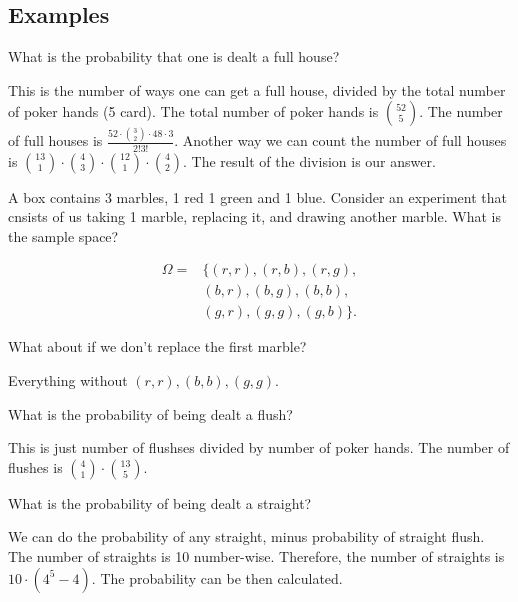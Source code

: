 \subsection{Examples}

\begin{eg}
	What is the probability that one is dealt a full house?
\end{eg}
\begin{explanation}
	This is the number of ways one can get a full house, divided by the total number of poker hands (5 card). The total number of poker hands is \( \binom{52}{5} \). The number of full houses is \( \frac{52 \cdot \binom{3}{2} \cdot 48 \cdot 3}{2!3!} \). Another way we can count the number of full houses is \( \binom{13}{1} \cdot \binom{4}{3} \cdot \binom{12}{1} \cdot \binom{4}{2}\). The result of the division is our answer.
\end{explanation}

\begin{eg}
	A box contains 3 marbles, 1 red 1 green and 1 blue. Consider an experiment that cnsists of us taking 1 marble, replacing it, and drawing another marble. What is the sample space?
\end{eg}
\begin{explanation}
	\begin{align*}
		\Omega = & \{(r,r),(r,b),(r,g), \\ & (b,r),(b,g),(b,b), \\ & (g,r),(g,g),(g,b)\}
	.\end{align*}
\end{explanation}

\begin{eg}
	What about if we don't replace the first marble?
\end{eg}
\begin{explanation}
	Everything without \( (r,r),(b,b),(g,g) \).
\end{explanation}

\begin{eg}
	What is the probability of being dealt a flush?
\end{eg}
\begin{explanation}
	This is just number of flushses divided by number of poker hands. The number of flushes is \( \binom{4}{1} \cdot \binom{13}{5} \).
\end{explanation}

\begin{eg}
	What is the probability of being dealt a straight?
\end{eg}
\begin{explanation}
	We can do the probability of any straight, minus probability of straight flush. The number of straights is 10 number-wise. Therefore, the number of straights is \( 10 \cdot (4^5 - 4) \). The probability can be then calculated.
\end{explanation}

